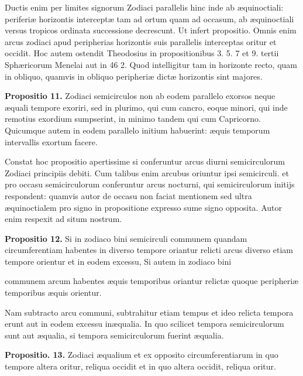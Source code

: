 \documentclass[11pt,a4paper]{article}
\begin{document}
Ductis enim per limites signorum Zodiaci parallelis hinc inde ab æquinoctiali: periferiæ horizontis interceptæ tam ad ortum quam ad occasum, ab æquinoctiali versus tropicos ordinata successione decrescunt. Ut infert propositio. Omnis enim arcus zodiaci apud peripherias horizontis suis parallelis interceptas oritur et occidit. Hoc autem ostendit Theodosius in propositionibus 3. 5. 7 et 9. tertii Sphæricorum Menelai aut in 46 2. Quod intelligitur tam in horizonte recto, quam in obliquo, quamvis in obliquo peripheriæ dictæ horizontis sint majores.

\textbf{Propositio 11.} Zodiaci semicirculos non ab eodem parallelo exorsos neque æquali tempore exoriri, sed in plurimo, qui cum cancro, eoque minori, qui inde remotius exordium sumpserint, in minimo tandem qui cum Capricorno. Quicumque autem in eodem parallelo initium habuerint: æquis temporum intervallis exortum facere.

Constat hoc propositio apertissime si conferuntur arcus diurni semicirculorum Zodiaci principiis debiti. Cum talibus enim arcubus oriuntur ipsi semicirculi. et pro occasu semicirculorum conferuntur arcus nocturni, qui semicirculorum initijs respondent: quamvis autor de occasu non faciat mentionem sed ultra æquinoctialem pro signo in propositione expresso sume signo opposita. Autor enim respexit ad situm nostrum.

\textbf{Propositio 12.} Si in zodiaco bini semicirculi communem quandam circumferentiam habentes in diverso tempore oriantur relicti arcus diverso etiam tempore orientur et in eodem excessu, Si autem in zodiaco bini

communem arcum habentes æquis temporibus oriantur relictæ quoque peripheriæ temporibus æquis orientur.

Nam subtracto arcu communi, subtrahitur etiam  tempus et ideo relicta tempora erunt aut in eodem excessu inæqualia. In quo scilicet tempora semicirculorum sunt aut æqualia, si tempora semicirculorum fuerint æqualia.

\textbf{Propositio. 13.} Zodiaci æqualium et ex opposito circumferentiarum in quo tempore altera oritur, reliqua occidit et in quo altera occidit, reliqua  oritur.
\end{document}
